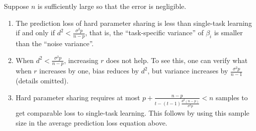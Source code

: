 	Suppose $n$ is sufficiently large so that the error is negligible.
\begin{enumerate}
	\item The prediction loss of hard parameter sharing is less than single-task learning if and only if ${d^2}{} < \frac{\sigma^2 p}{n - p}$, that is, the ``task-specific variance'' of $\beta_i$ is smaller than the ``noise variance''.
	\item When ${d^2}{} < \frac{\sigma^2 p}{n - p}$, increasing $r$ does not help.
	To see this, one can verify what when $r$ increases by one, bias reduces by ${d^2}{}$, but variance increases by $\frac{\sigma^2 p}{n-1}$ (details omitted).
	\item Hard parameter sharing requires at most $p + \frac{n - p}{t - (t - 1)\frac{d^2 (n - p)}{\sigma^2 p}} < n$ samples to get comparable loss to single-task learning.
	This follows by using this sample size in the average prediction loss equation above.
\end{enumerate}


